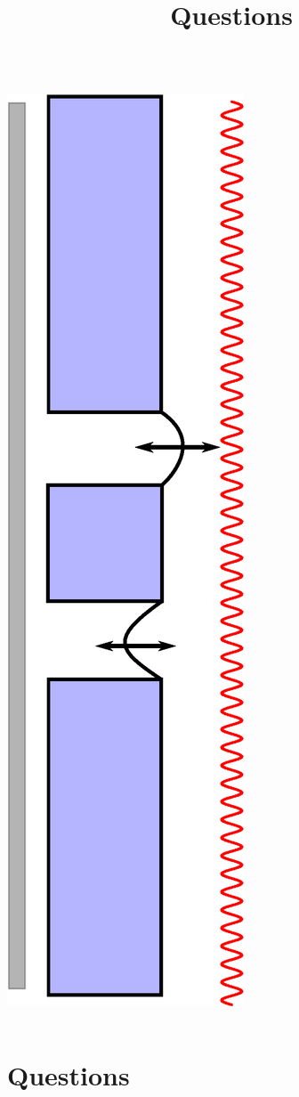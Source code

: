 \documentclass[hyperref={colorlinks=true,urlcolor=blue,linkcolor=.},aspectratio=1610,mathserif]{beamer}
\begin{document}
\begin{frame}
\begin{columns}[T]
\begin{center}
   \includegraphics[height=0.6\textheight]{Figures/Fuck_dig_christoffer.eps}
  \end{center}
 \end{columns}
\end{frame}

\section*{Questions}
\title{Questions}
\subtitle{}
\begin{frame}
 \titlepage
\end{frame}
\end{document}
